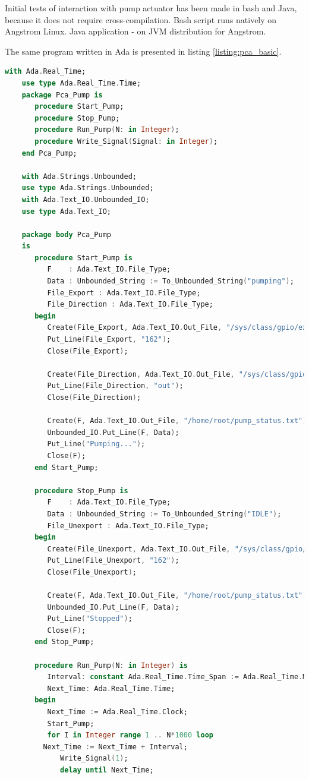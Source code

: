 Initial tests of interaction with pump actuator has been made in bash and Java, because it does not require cross-compilation. Bash script runs natively on Angstrom Linux. Java application - on JVM distribution for Angstrom. 

The same program written in Ada is presented in listing \ref{listing:pca_basic}.

\begin{lstlisting}[language=ada, frame=single, gobble=0, caption={Turning pin on and off}]
	with Ada.Real_Time;
	use type Ada.Real_Time.Time;
	package Pca_Pump is   
	   procedure Start_Pump;
	   procedure Stop_Pump;
	   procedure Run_Pump(N: in Integer);
	   procedure Write_Signal(Signal: in Integer);
	end Pca_Pump;

	with Ada.Strings.Unbounded;
	use type Ada.Strings.Unbounded;
	with Ada.Text_IO.Unbounded_IO;
	use type Ada.Text_IO;

	package body Pca_Pump
	is
	   procedure Start_Pump is
	      F    : Ada.Text_IO.File_Type;
	      Data : Unbounded_String := To_Unbounded_String("pumping");
	      File_Export : Ada.Text_IO.File_Type;
	      File_Direction : Ada.Text_IO.File_Type;
	   begin
	      Create(File_Export, Ada.Text_IO.Out_File, "/sys/class/gpio/export");
	      Put_Line(File_Export, "162");
	      Close(File_Export);

	      Create(File_Direction, Ada.Text_IO.Out_File, "/sys/class/gpio/gpio162/direction");
	      Put_Line(File_Direction, "out");
	      Close(File_Direction);

	      Create(F, Ada.Text_IO.Out_File, "/home/root/pump_status.txt");
	      Unbounded_IO.Put_Line(F, Data);
	      Put_Line("Pumping...");
	      Close(F);
	   end Start_Pump;

	   procedure Stop_Pump is
	      F    : Ada.Text_IO.File_Type;
	      Data : Unbounded_String := To_Unbounded_String("IDLE");
	      File_Unexport : Ada.Text_IO.File_Type;
	   begin
	      Create(File_Unexport, Ada.Text_IO.Out_File, "/sys/class/gpio/unexport");
	      Put_Line(File_Unexport, "162");
	      Close(File_Unexport);

	      Create(F, Ada.Text_IO.Out_File, "/home/root/pump_status.txt");
	      Unbounded_IO.Put_Line(F, Data);
	      Put_Line("Stopped");
	      Close(F);
	   end Stop_Pump;

	   procedure Run_Pump(N: in Integer) is
	      Interval: constant Ada.Real_Time.Time_Span := Ada.Real_Time.Milliseconds(100);
	      Next_Time: Ada.Real_Time.Time;
	   begin
	      Next_Time := Ada.Real_Time.Clock;
	      Start_Pump;
	      for I in Integer range 1 .. N*1000 loop
		 Next_Time := Next_Time + Interval;
	         Write_Signal(1);
	         delay until Next_Time;


\end{lstlisting}
